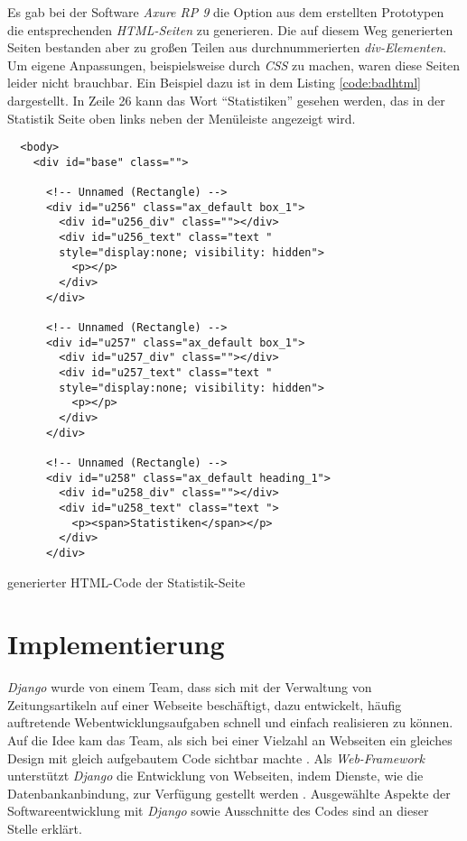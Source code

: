 \documentclass[11pt,a4paper]{report}
\begin{document}
Es gab bei der Software \textit{Axure RP 9} die Option aus dem erstellten Prototypen die entsprechenden \textit{HTML-Seiten} zu generieren. Die auf diesem Weg generierten Seiten bestanden aber zu großen Teilen aus durchnummerierten \textit{div-Elementen}. Um eigene Anpassungen, beispielsweise durch \textit{CSS} zu machen, waren diese Seiten leider nicht brauchbar. Ein Beispiel dazu ist in dem Listing \ref{code:badhtml} dargestellt. In Zeile 26 kann das Wort "`Statistiken"' gesehen werden, das in der Statistik Seite oben links neben der Menüleiste angezeigt wird.


\begin{listing}[htbp]
\begin{lstlisting}
  <body>
    <div id="base" class="">

      <!-- Unnamed (Rectangle) -->
      <div id="u256" class="ax_default box_1">
        <div id="u256_div" class=""></div>
        <div id="u256_text" class="text " 
        style="display:none; visibility: hidden">
          <p></p>
        </div>
      </div>

      <!-- Unnamed (Rectangle) -->
      <div id="u257" class="ax_default box_1">
        <div id="u257_div" class=""></div>
        <div id="u257_text" class="text " 
        style="display:none; visibility: hidden">
          <p></p>
        </div>
      </div>

      <!-- Unnamed (Rectangle) -->
      <div id="u258" class="ax_default heading_1">
        <div id="u258_div" class=""></div>
        <div id="u258_text" class="text ">
          <p><span>Statistiken</span></p>
        </div>
      </div>
\end{lstlisting}
\caption{generierter HTML-Code der Statistik-Seite}
\label{code:badhtml}
\end{listing}






\chapter{Implementierung} 
\label{c:imp}

\textit{Django} wurde von einem Team, dass sich mit der Verwaltung von Zeitungsartikeln auf einer Webseite beschäftigt, dazu entwickelt, häufig auftretende Webentwicklungsaufgaben schnell und einfach realisieren zu können.  Auf die Idee kam das Team, als sich bei einer Vielzahl an Webseiten ein gleiches Design mit gleich aufgebautem Code sichtbar machte \cite{mozillatuto1}. Als \textit{Web-Framework} unterstützt \textit{Django} die Entwicklung von Webseiten, indem Dienste, wie die Datenbankanbindung, zur Verfügung gestellt werden \cite{webframe}. Ausgewählte Aspekte der Softwareentwicklung mit \textit{Django} sowie Ausschnitte des Codes sind an dieser Stelle erklärt.
\end{document}
